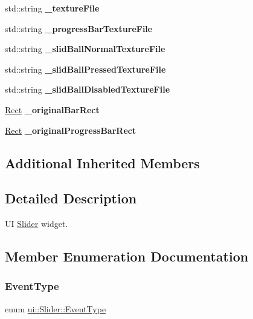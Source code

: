 \begin{DoxyCompactItemize}
std\+::string {\bfseries \+\_\+texture\+File}
\item 
\mbox{\label{classui_1_1Slider_a4de507690ea901a7014e005382963cb9}} 
std\+::string {\bfseries \+\_\+progress\+Bar\+Texture\+File}
\item 
\mbox{\label{classui_1_1Slider_a7ed46d219135f68f6fab2dc4310b9dcd}} 
std\+::string {\bfseries \+\_\+slid\+Ball\+Normal\+Texture\+File}
\item 
\mbox{\label{classui_1_1Slider_ae5354d2f2a66c532e59b191f87585547}} 
std\+::string {\bfseries \+\_\+slid\+Ball\+Pressed\+Texture\+File}
\item 
\mbox{\label{classui_1_1Slider_aef8c5a88f504399307a15fe69abbb29a}} 
std\+::string {\bfseries \+\_\+slid\+Ball\+Disabled\+Texture\+File}
\item 
\mbox{\label{classui_1_1Slider_a537df4be698e8606d0113a7a66ef35a1}} 
\hyperlink{classRect}{Rect} {\bfseries \+\_\+original\+Bar\+Rect}
\item 
\mbox{\label{classui_1_1Slider_a68b49e4b38931a5df56251ac8db1aefe}} 
\hyperlink{classRect}{Rect} {\bfseries \+\_\+original\+Progress\+Bar\+Rect}
\end{DoxyCompactItemize}
\subsection*{Additional Inherited Members}


\subsection{Detailed Description}
UI \hyperlink{classui_1_1Slider}{Slider} widget. 

\subsection{Member Enumeration Documentation}
\mbox{\label{classui_1_1Slider_aaaaec31aa46f491595d338978033c267}} 
\subsubsection{\texorpdfstring{Event\+Type}{EventType}\hspace{0.1cm}{\footnotesize\ttfamily [1/2]}}
{\footnotesize\ttfamily enum \hyperlink{classui_1_1Slider_aaaaec31aa46f491595d338978033c267}{ui\+::\+Slider\+::\+Event\+Type}\hspace{0.3cm}{\ttfamily [strong]}}

